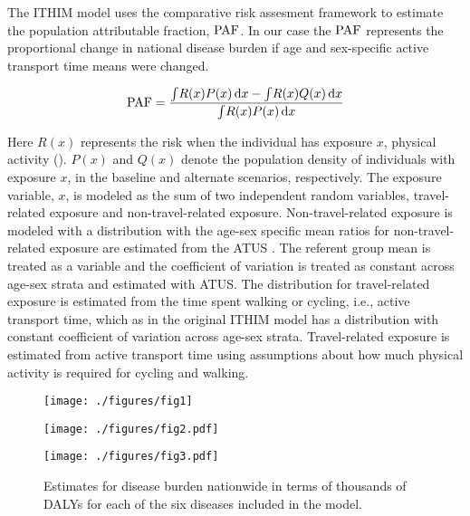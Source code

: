 The ITHIM model uses the comparative risk assesment framework to
estimate the population attributable fraction, $\mathrm{PAF}$.  In our case the
$\mathrm{PAF}$ represents the proportional change in national disease burden if
age and sex-specific active transport time means were changed.

\begin{equation}
\mathrm{PAF} = \frac{\int \! R(x)P(x) \, \mathrm{d}x  - \int \! R(x)Q(x) \, \mathrm{d}x}{\int \! R(x)P(x) \, \mathrm{d}x}
\end{equation}

Here $R(x)$ represents the risk when the individual has exposure $x$,
physical activity (\mets).  $P(x)$ and $Q(x)$ denote the population
density of individuals with exposure $x$, in the baseline and
alternate scenarios, respectively.  The exposure variable, $x$, is
modeled as the sum of two independent random variables, travel-related
exposure and non-travel-related exposure.  Non-travel-related exposure
is modeled with a \logNormal{} distribution with the age-sex specific
mean ratios for non-travel-related exposure are estimated from the
ATUS \cite{ATUS}.  The referent group mean is treated as a variable
and the coefficient of variation is treated as constant across age-sex
strata and estimated with ATUS.  The distribution for travel-related
exposure is estimated from the time spent walking or cycling, i.e.,
active transport time, which as in the original ITHIM model has
a \logNormal{} distribution with constant coefficient of variation
across age-sex strata.  Travel-related exposure is estimated from
active transport time using assumptions about how much physical
activity is required for cycling and walking.


\begin{figure}[t]
  \centerline{\texttt{[image: ./figures/fig1]}}
    \caption{}\label{fig1}
\end{figure}

\begin{figure}[t]
  \centerline{\texttt{[image: ./figures/fig2.pdf]}}
    \caption{}\label{fig2}
\end{figure}

\begin{figure}[t]
  \centerline{\texttt{[image: ./figures/fig3.pdf]}}
  \caption{Estimates for disease burden nationwide in terms of thousands of
    DALYs for each of the six diseases included in the model.
  }\label{fig3}
\end{figure}

